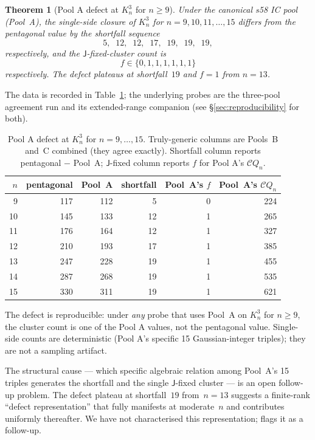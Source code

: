 \documentclass[12pt,a4paper]{article}
\newtheorem{theorem}{Theorem}[section]
\theoremstyle{definition}
\theoremstyle{remark}
\newcommand{\Kn}{K_n^3}
\newcommand{\Qn}{Q_n}
\newcommand{\Ccls}{\mathcal{C}}             %
\newcommand{\Jconj}{\mathsf{J}}             %
\begin{document}
\begin{theorem}[Pool A defect at $\Kn$ for $n \ge 9$]\label{thm:PoolA}
Under the canonical s58 IC pool (Pool~A), the single-side closure
of $\Kn$ for $n = 9, 10, 11, \dots, 15$ differs from the pentagonal
value by the shortfall sequence
\[
5, \;\; 12, \;\; 12, \;\; 17, \;\; 19, \;\; 19, \;\; 19,
\]
respectively, and the $\Jconj$-fixed-cluster count is
\[
f \in \{0, 1, 1, 1, 1, 1, 1\}
\]
respectively. The defect plateaus at shortfall~$19$ and $f = 1$ from
$n = 13$.
\end{theorem}

The data is recorded in Table~\ref{tab:PoolA}; the underlying probes
are the three-pool agreement run and its extended-range companion
(see \S\ref{sec:reproducibility} for both).

\begin{table}[H]\small
\centering
\caption{Pool A defect at $\Kn$ for $n = 9, \dots, 15$. Truly-generic
columns are Pools~B and~C combined (they agree exactly). Shortfall
column reports pentagonal $-$ Pool~A; $\Jconj$-fixed column reports
$f$ for Pool A's $\Ccls\Qn$.}\label{tab:PoolA}
\begin{tabular}{@{}rrrrrr@{}}
\toprule
$n$ & pentagonal & Pool~A & shortfall & Pool~A's $f$ & Pool~A's $\Ccls\Qn$ \\
\midrule
 9 & 117 & 112 &  5 & 0 & 224 \\
10 & 145 & 133 & 12 & 1 & 265 \\
11 & 176 & 164 & 12 & 1 & 327 \\
12 & 210 & 193 & 17 & 1 & 385 \\
13 & 247 & 228 & 19 & 1 & 455 \\
14 & 287 & 268 & 19 & 1 & 535 \\
15 & 330 & 311 & 19 & 1 & 621 \\
\bottomrule
\end{tabular}
\end{table}

The defect is reproducible: under \emph{any} probe that uses Pool~A
on $\Kn$ for $n \ge 9$, the cluster count is one of the Pool A
values, not the pentagonal value. Single-side counts are
deterministic (Pool A's specific 15 Gaussian-integer triples); they
are not a sampling artifact.

The structural cause --- which specific algebraic relation among
Pool~A's 15 triples generates the shortfall and the single
$\Jconj$-fixed cluster --- is an open follow-up problem. The defect
plateau at shortfall~$19$ from~$n = 13$ suggests a finite-rank
``defect representation'' that fully manifests at moderate~$n$ and
contributes uniformly thereafter. We have not characterised this
representation; \cite{closure-v5-audit-threebug} flags it as a
follow-up.
\end{document}
